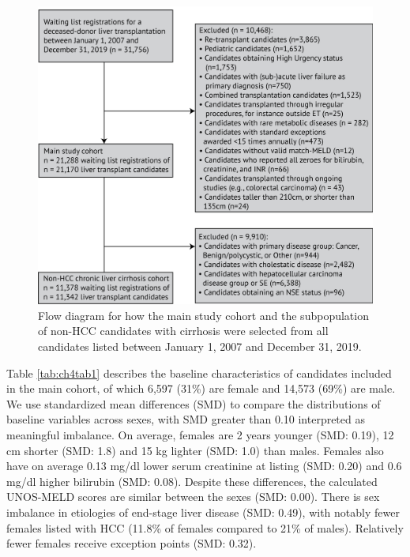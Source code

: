 \documentclass[11pt,twoside,]{book}
\begin{document}
\begin{figure}[ht]

{\centering \includegraphics[width=0.95\linewidth]{figures/ch4/fig2_flow_diagram} 

}

\caption{Flow diagram for how the main study cohort and the subpopulation of non-HCC candidates with cirrhosis were selected from all candidates listed between January 1, 2007 and December 31, 2019.}\label{fig:ch4fig2}
\end{figure}

\FloatBarrier

Table \ref{tab:ch4tab1} describes the baseline characteristics of candidates included in the
main cohort, of which 6,597 (31\%) are female and 14,573 (69\%) are male. We
use standardized mean differences (SMD) to compare the distributions of baseline
variables across sexes, with SMD greater than 0.10 interpreted as meaningful imbalance.
On average, females are 2 years younger (SMD: 0.19),
12 cm shorter (SMD: 1.8) and 15 kg lighter (SMD: 1.0) than males. Females also
have on average 0.13 mg/dl lower serum creatinine at listing (SMD: 0.20) and
0.6 mg/dl higher bilirubin (SMD: 0.08). Despite these
differences, the calculated UNOS-MELD scores are similar
between the sexes (SMD: 0.00).
There is sex imbalance in etiologies of end-stage liver disease (SMD: 0.49), with
notably fewer females listed with HCC (11.8\% of females compared to 21\% of males). Relatively fewer females receive
exception points (SMD: 0.32).
\end{document}
